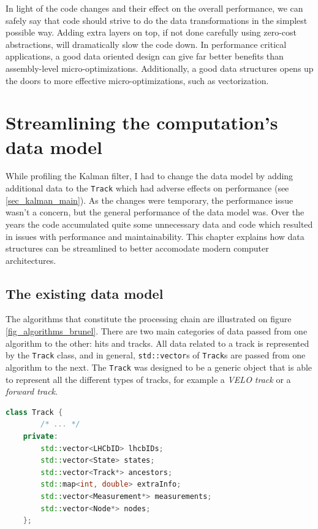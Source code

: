 \documentclass[12pt]{article}
\newcommand{\code}[1]{\texttt{#1}}
\begin{document}
In light of the code changes and their effect on the overall performance, we can safely say that code should strive to do the data transformations in the simplest possible way. Adding extra layers on top, if not done carefully using zero-cost abstractions, will dramatically slow the code down. In performance critical applications, a good data oriented design can give far better benefits than assembly-level micro-optimizations. Additionally, a good data structures opens up the doors to more effective micro-optimizations, such as vectorization.


\newpage
\section{Streamlining the computation's data model}\label{sec_datamodel_main}

While profiling the Kalman filter, I had to change the data model by adding additional data to the \code{Track} which had adverse effects on performance (see \ref{sec_kalman_main}). As the changes were temporary, the performance issue wasn't a concern, but the general performance of the data model was. Over the years the code accumulated quite some unnecessary data and code which resulted in issues with performance and maintainability. This chapter explains how data structures can be streamlined to better accomodate modern computer architectures.

\subsection{The existing data model}

The algorithms that constitute the processing chain are illustrated on figure \ref{fig_algorithms_brunel}. There are two main categories of data passed from one algorithm to the other: hits and tracks. All data related to a track is represented by the \code{Track} class, and in general, \code{std::vector}s of \code{Track}s are passed from one algorithm to the next. The \code{Track} was designed to be a generic object that is able to represent all the different types of tracks, for example a \textit{VELO track} or a \textit{forward track}.

\begin{lstlisting}[language=C++,caption=Simplified code of the \code{Track} class.,label=lst_datamodel_trackv2_simple
]
	class Track {
		/* ... */
	private:
		std::vector<LHCbID> lhcbIDs;
		std::vector<State> states;
		std::vector<Track*> ancestors;
		std::map<int, double> extraInfo;
		std::vector<Measurement*> measurements;
		std::vector<Node*> nodes;
	};	
\end{lstlisting}
\end{document}
